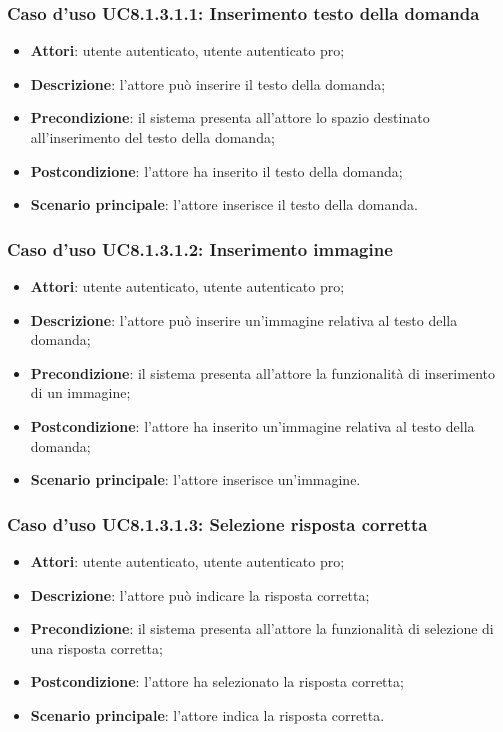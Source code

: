 \subsubsection{Caso d'uso UC8.1.3.1.1: Inserimento testo della domanda}
	\begin{itemize}
		\item
			\textbf{Attori}: utente autenticato, utente autenticato pro;
		\item		
			\textbf{Descrizione}: l'attore può inserire il testo della domanda;
		\item
			\textbf{Precondizione}: il sistema presenta all'attore lo spazio destinato all'inserimento del testo della domanda; 
		\item
			\textbf{Postcondizione}: l'attore ha inserito il testo della domanda;
		\item
			\textbf{Scenario principale}: l'attore inserisce il testo della domanda. 
	 			
	\end{itemize}
	
\subsubsection{Caso d'uso UC8.1.3.1.2: Inserimento immagine}
	\begin{itemize}
		\item
			\textbf{Attori}: utente autenticato, utente autenticato pro;
		\item		
			\textbf{Descrizione}: l'attore può inserire un'immagine relativa al testo della domanda;
		\item
			\textbf{Precondizione}: il sistema presenta all'attore la funzionalità di inserimento di un immagine; 
		\item
			\textbf{Postcondizione}: l'attore ha inserito un'immagine relativa al testo della domanda;
		\item
			\textbf{Scenario principale}: l'attore inserisce un'immagine.						
	\end{itemize}
	

\subsubsection{Caso d'uso UC8.1.3.1.3: Selezione risposta corretta}
	\begin{itemize}
		\item
			\textbf{Attori}: utente autenticato, utente autenticato pro;
		\item		
			\textbf{Descrizione}: l'attore può indicare la risposta corretta;
		\item
			\textbf{Precondizione}: il sistema presenta all'attore la funzionalità di selezione di una risposta corretta; 
		\item
			\textbf{Postcondizione}: l'attore ha selezionato la risposta corretta;
		\item
			\textbf{Scenario principale}: l'attore indica la risposta corretta.  			
	\end{itemize}